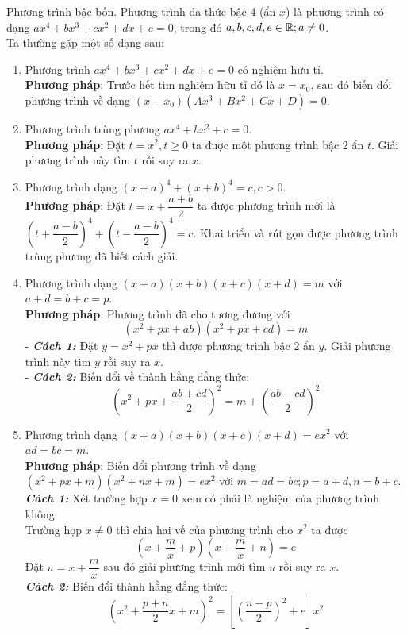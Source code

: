 \begin{dang}{Phương trình bậc bốn.}
	Phương trình đa thức bậc 4 (ẩn $x$) là phương trình có dạng $ax^4+bx^3+cx^2+dx+e=0$, trong đó $a,b,c,d,e \in \Bbb R; a\ne 0$. \\
    Ta thường gặp một số dạng sau:
    \begin{enumerate}[1)]
    \item Phương trình $ax^4+bx^3+cx^2+dx+e=0$ có nghiệm hữu tỉ.\\
    \textbf{Phương pháp}: Trước hết tìm nghiệm hữu tỉ đó là $x=x_0$, sau đó biến đổi phương trình về dạng $(x-x_0)(Ax^3+Bx^2+Cx+D)=0$.
    \item Phương trình trùng phương $ax^4+bx^2+c=0$.\\
    \textbf{Phương pháp}: Đặt $t=x^2, t \ge 0$ ta được một phương trình bậc 2 ẩn $t$. Giải phương trình này tìm $t$ rồi suy ra $x$.
    \item Phương trình dạng $(x+a)^4+(x+b)^4=c,c>0$.\\
    \textbf{Phương pháp}: Đặt $t=x+\dfrac{a+b}{2}$ ta được phương trình mới là $\left(t+\dfrac{a-b}{2}\right)^4+\left(t-\dfrac{a-b}{2}\right)^4=c$. Khai triển và rút gọn được phương trình trùng phương đã biết cách giải.
    \item Phương trình dạng $(x+a)(x+b)(x+c)(x+d)=m$ với $a+d=b+c=p$.\\
    \textbf{Phương pháp}: Phương trình đã cho tương đương với
		$$(x^2+px+ab)(x^2+px+cd)=m$$
		-  \textbf{\textit{Cách 1:}} Đặt $y=x^2+px$ thì được phương trình bậc 2 ẩn $y$. Giải phương trình này tìm $y$ rồi suy ra $x.$\\
		- \textbf{\textit{Cách 2:}} Biến đổi về thành hằng đẳng thức:
		$$\left(x^2+px+\dfrac{ab+cd}{2}\right)^2=m+\left(\dfrac{ab-cd}{2}\right)^2$$
    \item Phương trình dạng $(x+a)(x+b)(x+c)(x+d)=ex^2$ với $ad=bc=m$.\\
    \textbf{Phương pháp}: Biến đổi phương trình về dạng $(x^2+px+m)(x^2+nx+m)=ex^2$ với $m=ad=bc; p=a+d,n=b+c$.\\
		\textbf{\textit{Cách 1:}} Xét trường hợp $x=0$ xem có phải là nghiệm của phương trình không.\\
		Trường hợp $x \neq 0$ thì chia hai vế của phương trình cho $x^2$ ta được
		$$\left(x+\dfrac{m}{x}+p\right)\left(x+\dfrac{m}{x}+n\right)=e$$	
		Đặt $u=x+\dfrac{m}{x}$ sau đó giải phương trình mới tìm $u$ rồi suy ra $x$.\\
		\textbf{\textit{Cách 2:}} Biến đổi thành hằng đẳng thức:
		$$\left(x^2+\dfrac{p+n}{2}x+m\right)^2=\left[\left(\dfrac{n-p}{2}\right)^2+e\right]x^2$$
		

\end{enumerate}
\end{dang}
